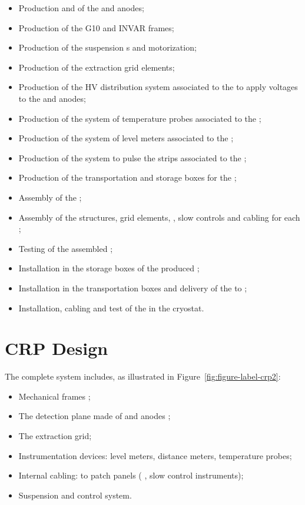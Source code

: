 \begin{itemize}
\item  Production and  of the  and anodes;
\item  Production of the G10 and INVAR frames;
\item Production of the suspension \fdth{}s and motorization;
\item Production of the extraction grid elements;
\item Production of the HV distribution system associated to the  to apply voltages to the  and anodes;
\item Production of the system of temperature probes associated to the ;
\item Production of the system of level meters associated to the ;
\item Production of the system to pulse the strips associated to the ;
\item Production of the transportation and storage boxes for the ;
\item Assembly of the ;
\item Assembly of the  structures,   grid elements, , slow controls and cabling for each ;
\item Testing of the assembled ;
\item Installation in the storage boxes of the produced ;
\item Installation in the transportation boxes and delivery of the  to \surf{}; %
\item Installation, cabling and test of the  in the cryostat.
\end{itemize}



\section{CRP Design}
\label{sec:fddp-crp-design}

The complete  system includes, as illustrated in Figure~\ref{fig:figure-label-crp2}:
\begin{itemize}
\item Mechanical frames  ;
\item The detection plane made of  and anodes ;
\item The extraction grid;
\item Instrumentation devices: level meters, distance meters, temperature probes;
\item Internal cabling: to patch panels ( , slow control instruments);
\item Suspension and control system.
\end{itemize}

